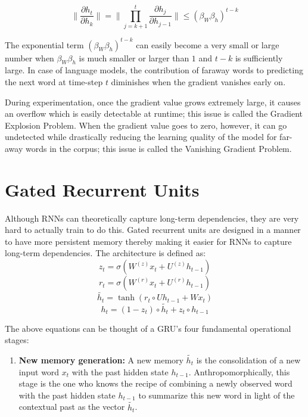 \documentclass{article}
\begin{document}
\begin{appendices}
	\[
		\parallel \frac{\partial h_t}{\partial h_k} \parallel = \parallel \prod_{j=k+1}^{t} \frac{\partial h_j}{\partial h_{j-1}} \parallel \leq (\beta_W \beta_h)^{t-k}
		\tag{9}
	\]
	
	The exponential term \((\beta_W \beta_h)^{t-k}\)  can easily become a very small or large number when \(\beta_W \beta_h\) is much smaller or larger than \(1\) and \(t-k\) is sufficiently large. In case of language models, the contribution of faraway words to predicting the next word at time-step \(t\) diminishes when the gradient vanishes early on.
	
	During experimentation, once the gradient value grows extremely large, it causes an overflow which is easily detectable at runtime; this issue is called the Gradient Explosion Problem. When the gradient value goes to zero, however, it can go undetected while drastically reducing the learning quality of the model for far-away words in the corpus; this issue is called the Vanishing Gradient Problem.
	
\section{Gated Recurrent Units}
\label{sec:gru}

	Although RNNs can theoretically capture long-term dependencies, they are very hard to actually train to do this. Gated recurrent units are designed in a manner to have more persistent memory thereby making it easier for RNNs to capture long-term dependencies. The architecture is defined as:
	\[
	z_t = \sigma (W^{(z)}x_t + U^{(z)}h_{t-1}) \tag{Update Gate}
	\]
	\[
	r_t = \sigma (W^{(r)}x_t + U^{(r)}h_{t-1}) \tag{Reset Gate}
	\]
	\[
	\widetilde{h_t} = \tanh (r_t \circ Uh_{t-1} + Wx_t) \tag{New Memory}
	\]
	\[
	h_t = (1-z_t) \circ \widetilde{h_t} + z_t \circ h_{t-1} \tag{Hidden State}
	\]
	
	The above equations can be thought of a GRU’s four fundamental operational stages:
	\begin{enumerate}
		
		\item \textbf{New memory generation:} A new memory  \(\widetilde{h_t}\) is the consolidation of a new input word \(x_t\) with the past hidden state \(h_{t-1}\). Anthropomorphically, this stage is the one who knows the recipe of combining a newly observed word with the past hidden state \(h_{t-1}\) to summarize this new word in light of the contextual past as the vector \(\widetilde{h_t}\).
		

\end{enumerate}
\end{appendices}
\end{document}
